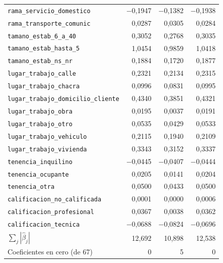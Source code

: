 \begin{longtable}{lrrr}
\texttt{rama\_servicio\_domestico} & $-$0,1947 & $-$0,1382 & $-$0,1938 \\
\texttt{rama\_transporte\_comunic} & 0,0287 & 0,0305 & 0,0284 \\
\texttt{tamano\_estab\_6\_a\_40} & 0,3052 & 0,2768 & 0,3035 \\
\texttt{tamano\_estab\_hasta\_5} & 1,0454 & 0,9859 & 1,0418 \\
\texttt{tamano\_estab\_ns\_nr} & 0,1884 & 0,1720 & 0,1877 \\
\texttt{lugar\_trabajo\_calle} & 0,2321 & 0,2134 & 0,2315 \\
\texttt{lugar\_trabajo\_chacra} & 0,0996 & 0,0831 & 0,0995 \\
\texttt{lugar\_trabajo\_domicilio\_cliente} & 0,4340 & 0,3851 & 0,4321 \\
\texttt{lugar\_trabajo\_obra} & 0,0195 & 0,0037 & 0,0191 \\
\texttt{lugar\_trabajo\_otro} & 0,0535 & 0,0429 & 0,0533 \\
\texttt{lugar\_trabajo\_vehiculo} & 0,2115 & 0,1940 & 0,2109 \\
\texttt{lugar\_trabajo\_vivienda} & 0,3343 & 0,3152 & 0,3337 \\
\texttt{tenencia\_inquilino} & $-$0,0445 & $-$0,0407 & $-$0,0444 \\
\texttt{tenencia\_ocupante} & 0,0205 & 0,0141 & 0,0204 \\
\texttt{tenencia\_otra} & 0,0500 & 0,0433 & 0,0500 \\
\texttt{calificacion\_no\_calificada} & 0,0001 & 0,0000 & 0,0006 \\
\texttt{calificacion\_profesional} & 0,0367 & 0,0038 & 0,0362 \\
\texttt{calificacion\_tecnica} & $-$0,0688 & $-$0,0824 & $-$0,0696 \\
\midrule
$\sum_j |\hat\beta_j|$ & 12,692 & 10,898 & 12,538 \\
Coeficientes en cero (de 67) & 0 & 5 & 0 \\
\bottomrule
\end{longtable}